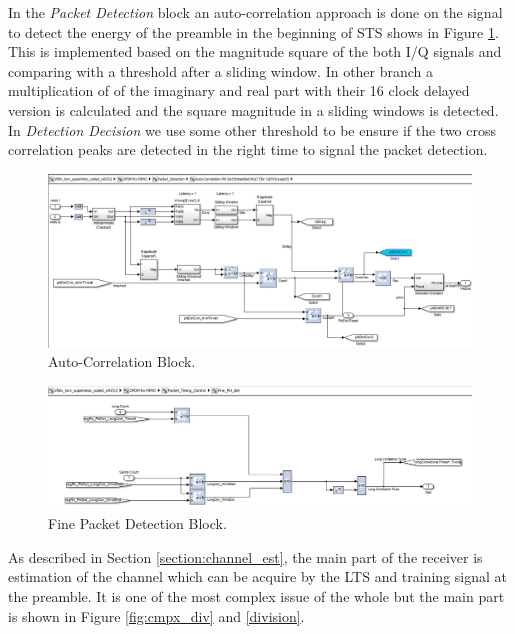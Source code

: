 In the \textit{Packet Detection} block an auto-correlation approach is done on the signal to detect the energy of the preamble in the beginning of STS shows in Figure \ref{fig:autocorrblock}. This is implemented based on the magnitude square of the both I/Q signals and comparing with a threshold after a sliding window. In other branch a multiplication of of the imaginary and real part with their 16 clock delayed version is calculated and the square magnitude in a sliding windows is detected. In \textit{Detection Decision} we use some other threshold to be ensure if the two cross correlation peaks are detected in the right time to signal the packet detection.

\begin{figure}
\centering
\includegraphics[width=\textwidth]{content/fig/autocorrblock.JPG}
\caption{Auto-Correlation Block.}
\label{fig:autocorrblock}
\end{figure}

\begin{figure}
\centering
\includegraphics[width=\textwidth]{content/fig/fine_packetDetect.JPG}
\caption{Fine Packet Detection Block.}
\label{fig:fine_packetDetect}
\end{figure}

As described in Section \ref{section:channel_est}, the main part of the receiver is estimation of the channel which can be acquire by the LTS and training signal at the preamble. It is one of the most complex issue of the whole but the main part is shown in Figure \ref{fig:cmpx_div} and \ref{division}.\\

